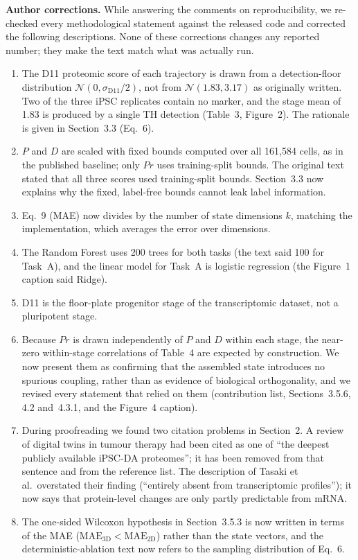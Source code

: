 \documentclass[11pt]{article}
\begin{document}
\medskip
\noindent\textbf{Author corrections.} While answering the comments on reproducibility, we re-checked every methodological statement against the released code and corrected the following descriptions. None of these corrections changes any reported number; they make the text match what was actually run.
\begin{enumerate}
  \item The D11 proteomic score of each trajectory is drawn from a detection-floor distribution $\mathcal{N}(0, \sigma_{\text{D11}}/2)$, not from $\mathcal{N}(1.83, 3.17)$ as originally written. Two of the three iPSC replicates contain no marker, and the stage mean of 1.83 is produced by a single TH detection (Table~3, Figure~2). The rationale is given in Section~3.3 (Eq.~6).
  \item $P$ and $D$ are scaled with fixed bounds computed over all 161,584 cells, as in the published baseline; only $Pr$ uses training-split bounds. The original text stated that all three scores used training-split bounds. Section~3.3 now explains why the fixed, label-free bounds cannot leak label information.
  \item Eq.~9 (MAE) now divides by the number of state dimensions $k$, matching the implementation, which averages the error over dimensions.
  \item The Random Forest uses 200 trees for both tasks (the text said 100 for Task~A), and the linear model for Task~A is logistic regression (the Figure~1 caption said Ridge).
  \item D11 is the floor-plate progenitor stage of the transcriptomic dataset, not a pluripotent stage.
  \item Because $Pr$ is drawn independently of $P$ and $D$ within each stage, the near-zero within-stage correlations of Table~4 are expected by construction. We now present them as confirming that the assembled state introduces no spurious coupling, rather than as evidence of biological orthogonality, and we revised every statement that relied on them (contribution list, Sections~3.5.6, 4.2 and~4.3.1, and the Figure~4 caption).
  \item During proofreading we found two citation problems in Section~2. A review of digital twins in tumour therapy had been cited as one of ``the deepest publicly available iPSC-DA proteomes''; it has been removed from that sentence and from the reference list. The description of Tasaki et al.\ overstated their finding (``entirely absent from transcriptomic profiles''); it now says that protein-level changes are only partly predictable from mRNA.
  \item The one-sided Wilcoxon hypothesis in Section~3.5.3 is now written in terms of the MAE ($\text{MAE}_{3\text{D}} < \text{MAE}_{2\text{D}}$) rather than the state vectors, and the deterministic-ablation text now refers to the sampling distribution of Eq.~6.
\end{enumerate}
\end{document}
